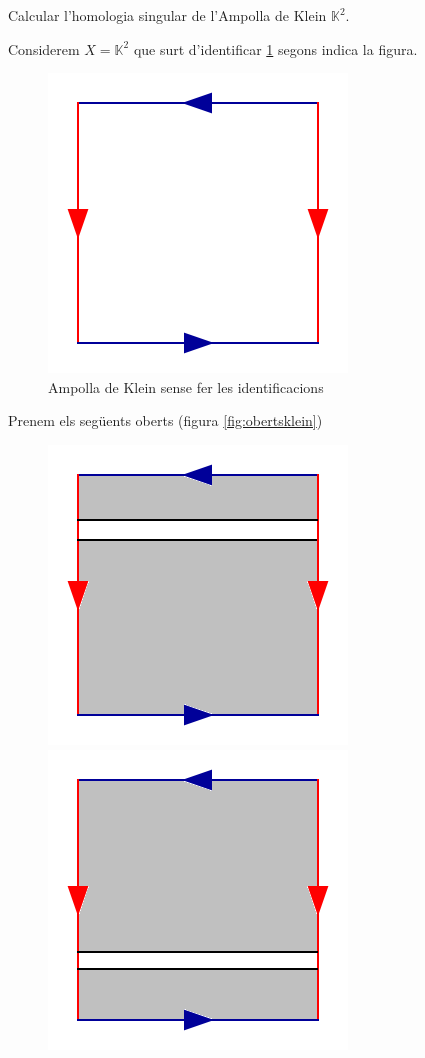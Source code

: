 \documentclass[../main.tex]{subfiles}
\begin{document}
\begin{exercici}
 Calcular l'homologia singular de l'Ampolla de Klein $\mathbb{K}^2$.
\end{exercici}
\begin{sol}
Considerem $X = \mathbb{K}^2$ que surt d'identificar \ref{fig:kleinex} segons indica la figura.
\begin{figure}[H]
    \centering
    \includegraphics[scale = 0.25]{pictures/kleinbottle.png}
    \caption{Ampolla de Klein sense fer les identificacions}
    \label{fig:kleinex}
\end{figure}
Prenem els següents oberts (figura \ref{fig:obertsklein})
\begin{figure}[H]
    \centering
    \includegraphics[scale = 0.25]{pictures/kleinU.png}
    \includegraphics[scale = 0.25]{pictures/kleinV.png}

\end{figure}
\end{sol}
\end{document}

